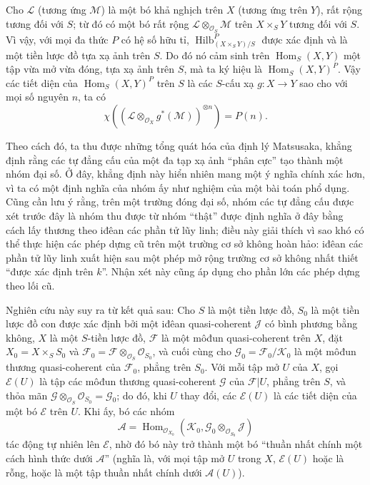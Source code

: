 Cho $\mathcal L$ (tương ứng $\mathcal M$) là một bó khả nghịch trên $X$ (tương
ứng trên $Y$), rất rộng tương đối với $S$; từ đó có một bó rất rộng
$\mathcal L\otimes_{\mathcal O_S}\mathcal M$ trên $X\times_SY$ tương đối với
$S$. Vì vậy, với mọi đa thức $P$ có hệ số hữu tỉ,
$\operatorname{Hilb}^P_{(X\times_SY)/S}$ được xác định và là một tiền lược đồ
tựa xạ ảnh trên $S$. Do đó nó cảm sinh trên $\operatorname{Hom}_S(X,Y)$ một
tập vừa mở vừa đóng, tựa xạ ảnh trên $S$, mà ta ký hiệu là
$\operatorname{Hom}_S(X,Y)^P$. Vậy các tiết diện của
$\operatorname{Hom}_S(X,Y)^P$ trên $S$ là các $S$-cấu xạ
$g:X\longrightarrow Y$ sao cho với mọi số nguyên $n$, ta có
\[
\chi\!\left(\left(\mathcal L\otimes_{\mathcal O_X}g^*(\mathcal M)\right)^{
\otimes n}\right)=P(n).
\]

Theo cách đó, ta thu được những tổng quát hóa của định lý Matsusaka, khẳng định
rằng các tự đẳng cấu của một đa tạp xạ ảnh ``phân cực'' tạo thành một nhóm đại
số. Ở đây, khẳng định này hiển nhiên mang một ý nghĩa chính xác hơn, vì ta có
một định nghĩa của nhóm ấy như nghiệm của một bài toán phổ dụng. Cũng cần lưu ý
rằng, trên một trường đóng đại số, nhóm các tự đẳng cấu được xét trước đây là
nhóm thu được từ nhóm ``thật'' được định nghĩa ở đây bằng cách lấy thương theo
iđêan các phần tử lũy linh; điều này giải thích vì sao khó có thể thực hiện các
phép dựng cũ trên một trường cơ sở không hoàn hảo: iđêan các phần
tử lũy linh xuất hiện sau một phép mở rộng trường cơ sở không nhất thiết
``được xác định trên $k$''. Nhận xét này cũng áp dụng cho phần lớn các phép dựng
theo lối cũ.


Nghiên cứu này suy ra từ kết quả sau:
 Cho $S$ là một tiền lược đồ, $S_0$ là một tiền lược đồ con
được xác định bởi một iđêan quasi-coherent $\mathcal J$ có bình phương bằng
không, $X$ là một $S$-tiền lược đồ, $\mathcal F$ là một môđun quasi-coherent
trên $X$, đặt $X_0=X\times_SS_0$ và
$\mathcal F_0=\mathcal F\otimes_{\mathcal O_S}\mathcal O_{S_0}$, và cuối cùng
cho $\mathcal G_0=\mathcal F_0/\mathcal K_0$ là một môđun thương
quasi-coherent của $\mathcal F_0$, phẳng trên $S_0$. Với mỗi tập mở $U$ của
$X$, gọi $\mathcal E(U)$ là tập các môđun thương quasi-coherent $\mathcal G$
của $\mathcal F|U$, phẳng trên $S$, và thỏa mãn
$\mathcal G\otimes_{\mathcal O_S}\mathcal O_{S_0}=\mathcal G_0$; do đó, khi
$U$ thay đổi, các $\mathcal E(U)$ là các tiết diện của một bó $\mathcal E$
trên $U$. Khi ấy, bó các nhóm
\[
\mathcal A=\operatorname{Hom}_{\mathcal O_{X_0}}
(\mathcal K_0,\mathcal G_0\otimes_{\mathcal O_{S_0}}\mathcal J)
\]
tác động tự nhiên lên $\mathcal E$, nhờ đó bó này trở thành một bó
``thuần nhất chính một cách hình thức dưới $\mathcal A$'' (nghĩa là, với mọi
tập mở $U$ trong $X$, $\mathcal E(U)$ hoặc là rỗng, hoặc là một tập thuần nhất
chính dưới $\mathcal A(U)$).

